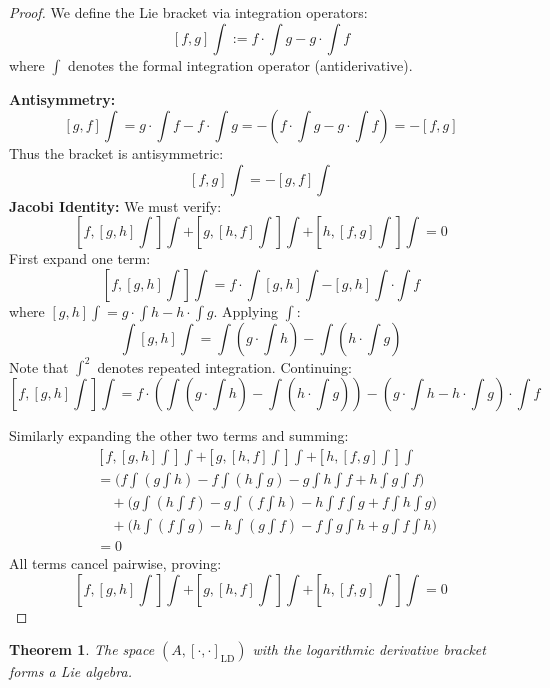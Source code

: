 \documentclass[10pt, oneside]{article}
\newtheorem{thm}{Theorem}
\begin{document}
\begin{proof}
We define the Lie bracket via integration operators:
\[
[f,g]\int := f \cdot \int g - g \cdot \int f
\]
where $\int $ denotes the formal integration operator (antiderivative).

\noindent\textbf{Antisymmetry:}
\[
[g,f]\int = g \cdot \int f - f \cdot \int g = - (f \cdot \int g - g \cdot \int f) = -[f,g]
\]
Thus the bracket is antisymmetric:
\[
\boxed{[f,g]\int = -[g,f]\int}
\]
\noindent\textbf{Jacobi Identity:}
We must verify:
\[
[f,[g,h]\int]\int + [g,[h,f]\int]\int + [h,[f,g]\int]\int = 0
\]
First expand one term:
\[
[f,[g,h] \int]\int = f \cdot \int [g,h] \int - [g,h] \int \cdot \int f
\]
where $[g,h]\int = g \cdot \int h - h \cdot \int g$. Applying $\int $:
\[
\int [g,h] \int= \int (g \cdot \int h) - \int (h \cdot \int g)
\]
Note that $\int ^2$ denotes repeated integration. Continuing:
\[
[f,[g,h]\int]\int = f \cdot (\int (g \cdot \int h) - \int (h \cdot \int g)) - (g \cdot \int h - h \cdot \int g) \cdot \int f
\]

Similarly expanding the other two terms and summing:
\[
\begin{aligned}
&[f,[g,h]\int]\int + [g,[h,f]\int]\int + [h,[f,g]\int]\int \\
&= \big(f \int (g \int h) - f \int (h \int g) - g \int h \int f + h \int g \int f\big) \\
&\quad + \big(g \int (h \int f) - g \int (f \int h) - h \int f \int g + f \int h \int g\big) \\
&\quad + \big(h \int (f \int g) - h \int (g \int f) - f \int g \int h + g \int f \int h\big) \\
&= 0
\end{aligned}
\]
All terms cancel pairwise, proving:
\[
\boxed{[f,[g,h]\int]\int + [g,[h,f]\int]\int + [h,[f,g]\int]\int = 0}
\]


\end{proof}
   
   \begin{thm}
The space $(A, [\cdot,\cdot]_{\text{LD}})$ with the logarithmic derivative bracket forms a Lie algebra.
\end{thm}
\end{document}
